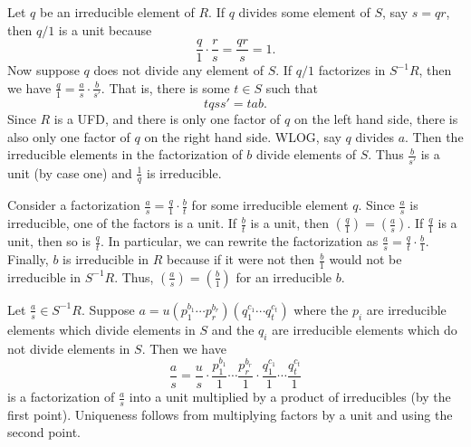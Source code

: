 \documentclass[../../master.tex]{subfiles}
\begin{document}
    \begin{solution}
        Let $q$ be an irreducible element of $R$. If $q$ divides some element of
        $S$, say $s = qr$, then $q / 1$ is a unit because
        \[
        \frac{q}{1} \cdot \frac{r}{s} = \frac{qr}{s} = 1.
        \] 
        Now suppose $q$ does not divide any element of $S$. If $q / 1$
        factorizes in $S^{-1}R$, then we have $\frac{q}{1} = \frac{a}{s} \cdot
        \frac{b}{s'}$. That is, there is some $t \in S$ such that
        \[
            tqss' = tab.
        \] 
        Since $R$ is a UFD, and there is only one factor of $q$ on the left hand
        side, there is also only one factor of $q$ on the right hand side. WLOG,
        say $q$ divides $a$. Then the irreducible elements in the factorization
        of $b$ divide elements of $S$. Thus $\frac{b}{s'}$ is a unit (by case
        one) and $\frac{1}{q}$ is irreducible.

        Consider a factorization $\frac{a}{s} = \frac{q}{1} \cdot \frac{b}{t}$ 
        for some irreducible element $q$.  Since $\frac{a}{s}$ is irreducible,
        one of the factors is a unit. If $\frac{b}{t}$ is a unit, then
        $(\frac{q}{1}) = (\frac{a}{s})$. If $\frac{q}{1}$ is a unit, then so is
        $\frac{q}{t}$. In particular, we can rewrite the factorization as
        $\frac{a}{s} = \frac{q}{t} \cdot \frac{b}{1}$. Finally, $b$ is
        irreducible in $R$ because if it were not then $\frac{b}{1}$ would not
        be irreducible in $S^{-1}R$. Thus, $(\frac{a}{s}) = (\frac{b}{1})$ for
        an irreducible $b$.

        Let $\frac{a}{s} \in S^{-1}R$. Suppose $a = u (p_1^{b_1} \cdots
        p_r^{b_r}) (q_1^{c_1} \cdots q_t^{c_t})$ where the $p_i$ are
        irreducible elements which divide elements in $S$ and the $q_i$ are
        irreducible elements which do not divide elements in $S$. Then we have
        \[
            \frac{a}{s} = \frac{u}{s} \cdot \frac{p_1^{b_1}}{1} \cdots
            \frac{p_r^{b_r}}{1} \cdot \frac{q_1^{c_1}}{1} \cdots
            \frac{q_t^{c_t}}{1}
        \] 
        is a factorization of $\frac{a}{s}$ into a unit multiplied by a product
        of irreducibles (by the first point). Uniqueness follows from
        multiplying factors by a unit and using the second point.
    \end{solution}
\end{document}
